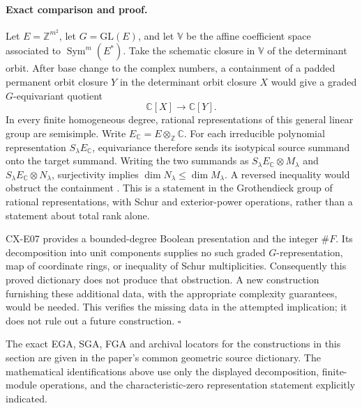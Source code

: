 \paragraph{Exact comparison and proof.}
Let \(E=\mathbb Z^{m^2}\), let \(G=\mathrm{GL}(E)\), and let
\(\mathbb V\) be the affine coefficient space associated to
\(\operatorname{Sym}^m(E^*)\).
Take the schematic closure in \(\mathbb V\) of the determinant orbit.
After base change to the complex numbers, a containment of a padded
permanent orbit closure \(Y\) in the determinant orbit closure \(X\)
would give a graded \(G\)-equivariant quotient
\[
 \mathbb C[X]\longrightarrow\mathbb C[Y].
\]
In every finite homogeneous degree, rational representations of this
general linear group are semisimple.
Write \(E_{\mathbb C}=E\otimes_{\mathbb Z}\mathbb C\).
For each irreducible polynomial representation
\(S_\lambda E_{\mathbb C}\), equivariance
therefore sends its isotypical source summand onto the target
summand. Writing the two summands as
\(S_\lambda E_{\mathbb C}\otimes M_\lambda\) and
\(S_\lambda E_{\mathbb C}\otimes N_\lambda\), surjectivity implies
\(\dim N_\lambda\leq\dim M_\lambda\).
A reversed inequality would obstruct the containment
\cite[\S7.4, (7.6), p.~38, and (7.9), p.~39]{Burgisser2024}.
This is a statement in the Grothendieck group of rational
representations, with Schur and exterior-power operations, rather
than a statement about total rank alone.

CX-E07 provides a bounded-degree Boolean presentation and the integer
\(\#F\).
Its decomposition into unit components supplies no such graded
\(G\)-representation, map of coordinate rings, or inequality of Schur
multiplicities.
Consequently this proved dictionary does not produce that obstruction.
A new construction furnishing these additional data, with the
appropriate complexity guarantees, would be needed.
This verifies the missing data in the attempted implication; it does
not rule out a future construction.
\hfill\(\square\)

The exact EGA, SGA, FGA and archival locators for the constructions in
this section are given in the paper's common geometric source
dictionary. The mathematical identifications above use only the
displayed decomposition, finite-module operations, and the
characteristic-zero representation statement explicitly indicated.
